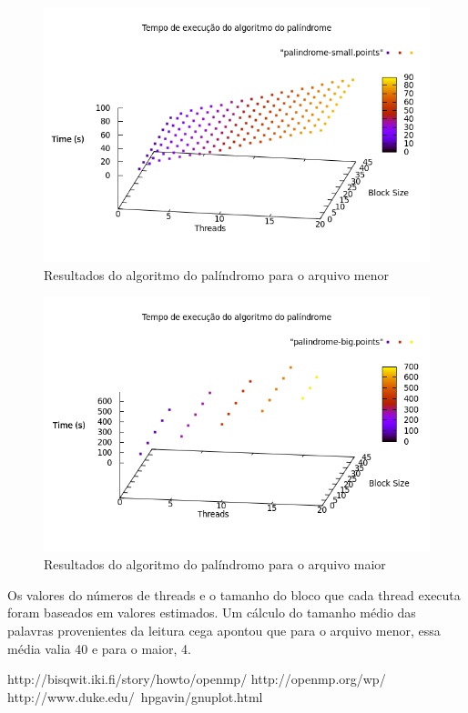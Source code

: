 \documentclass[a4paper]{article}
\begin{document}
\begin{figure}[float=h]
	\begin{center}
		\includegraphics[scale=0.5]{palindrome-small}
	\end{center}
	\caption{Resultados do algoritmo do palíndromo para o arquivo menor}
	\label{palindrome-small}
\end{figure}
\begin{figure}[float=h]
	\begin{center}
		\includegraphics[scale=0.5]{palindrome-big}
	\end{center}
	\caption{Resultados do algoritmo do palíndromo para o arquivo maior}
	\label{palindrome-big}
\end{figure}

Os valores do números de threads e o tamanho do bloco que cada thread executa foram baseados em valores estimados. Um cálculo do tamanho médio das palavras provenientes da leitura cega apontou que para o arquivo menor, essa média valia 40 e para o maior, 4.

\newpage
\begin{thebibliography}{99}
	http://bisqwit.iki.fi/story/howto/openmp/
	http://openmp.org/wp/
	http://www.duke.edu/~hpgavin/gnuplot.html
\end{thebibliography}
\end{document}
